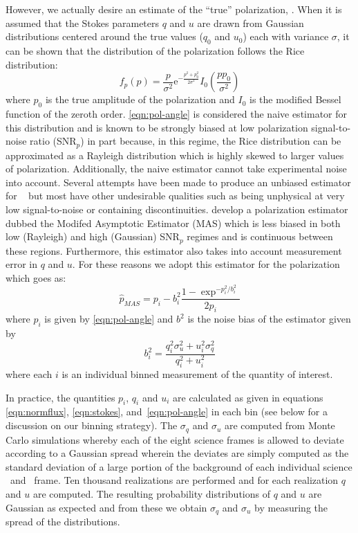 However, we actually desire an estimate of the ``true'' polarization,  \po.  When it is assumed that the Stokes parameters $q$ and $u$ are drawn from Gaussian distributions centered around the true values ($q_0$ and $u_0$) each with variance $\sigma$,  it can be shown \cite[e.g.][]{Plaszczynski2014} that the distribution of the polarization follows the Rice distribution:
\begin{equation}
f_p(p) = \frac{p}{\sigma^2}\mathrm{e}^{-\frac{p^2 + p_0^2}{2\sigma^2}}I_0(\frac{pp_0}{\sigma^2})
\end{equation}
where $p_0$ is the true amplitude of the polarization and $I_0$ is the modified Bessel function of the zeroth order.  \autoref{eqn:pol-angle} is considered the naive estimator for this distribution and is known to be strongly biased at low polarization signal-to-noise ratio (SNR$_p$) in part because, in this regime, the Rice distribution can be approximated as a Rayleigh distribution which is highly skewed to larger values of polarization. Additionally, the naive estimator cannot take experimental noise into account. Several attempts have been made to produce an unbiased estimator for \po~\citep[see][for a review]{SimmonsStewart1985} but most have other undesirable qualities such as being unphysical at very low signal-to-noise or containing discontinuities.  \cite{Plaszczynski2014} develop a polarization estimator dubbed the Modifed Asymptotic Estimator (MAS) which is less biased in both low (Rayleigh) and high (Gaussian) SNR$_p$ regimes and is continuous between these regions. Furthermore, this estimator also takes into account measurement error in $q$ and $u$. For these reasons we adopt this estimator for the polarization which goes as:
\begin{equation}\label{eqn: pmas}
\hat{p}_{MAS} = p_i - b_i^2\frac{1-\exp^{-p_i^2/b_i^2}}{2p_i}
\end{equation}
where $p_i$ is given by \autoref{eqn:pol-angle} and $b^2$ is the noise bias of the estimator given by
\begin{equation}\label{eqn: noisebias}
b_i^2 = \frac{q_i^2\sigma_u^2 + u_i^2\sigma_q^2}{q_i^2 + u_i^2}
\end{equation}
where each $i$ is an individual binned measurement of the quantity of interest.

In practice, the quantities $p_i$, $q_i$ and $u_i$ are calculated as given in equations   \ref{eqn:normflux}, \ref{eqn:stokes}, and~\ref{eqn:pol-angle} in each bin (see below for a discussion on our binning strategy).  The $\sigma_q$ and $\sigma_u$ are computed from Monte Carlo simulations whereby each of the eight science frames is allowed to deviate according to a Gaussian spread wherein the deviates are simply computed as the standard deviation of a large portion of the background of each individual science \ord~and \ext~frame. Ten thousand realizations are performed and for each realization $q$ and $u$ are computed. The resulting probability distributions of $q$ and $u$ are Gaussian as expected and from these we obtain $\sigma_q$ and $\sigma_u$ by measuring the spread of the distributions.

